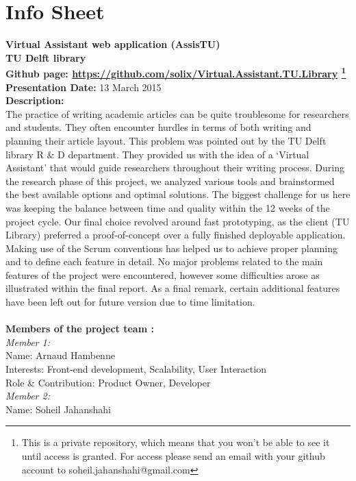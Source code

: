 \chapter{Info Sheet}    
\textbf{Virtual Assistant web application (AssisTU)\\}
\textbf{\small{TU Delft library\\}}
\textbf{Github page: \url{https://github.com/solix/Virtual.Assistant.TU.Library} \footnote{This is a private repository, which means that you won't be able to see it until access is granted. For access please send an email with your github account to soheil.jahanshahi@gmail.com}\\} 
\textbf{Presentation Date: } 13 March 2015\\ 
\bigskip
\textbf{Description: \\}
The practice of writing academic articles can be quite troublesome for researchers and students. They often encounter hurdles in terms of both writing  and planning their article layout. This problem was pointed out by the TU Delft library R \& D department. They provided us with the idea of a `Virtual Assistant' that would guide researchers throughout their writing process. During the research phase of this project, we analyzed various tools and brainstormed the best available options and optimal solutions. The biggest challenge for us here was keeping the balance between time and quality within the 12 weeks of the project cycle. Our final choice revolved around fast prototyping, as the client (TU Library) preferred a proof-of-concept over a fully finished deployable application. Making use of the Scrum conventions has helped us to achieve proper planning and to define each feature in detail. No major problems related to the main features of the project were encountered, however some difficulties arose as illustrated within the final report. As a final remark, certain additional features have been left out for future version due to time limitation.\\\\
 \textbf{Members of the project team :\\}
 \textit{Member 1: \\}
	Name: Arnaud Hambenne\\
	Interests: Front-end development, Scalability, User Interaction\\ 
	Role \& Contribution: Product Owner, Developer\\
   \textit{Member 2: \\}
   Name: Soheil Jahanshahi\\
